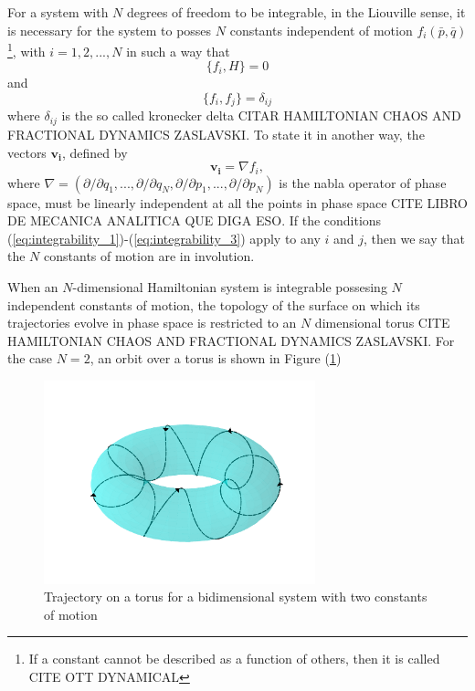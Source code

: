 For a system with $N$ degrees of freedom to be integrable, in the Liouville sense, it is necessary for the system to posses $N$ constants independent of motion $f_i(\bar{p},\bar{q})$\footnote{If a constant cannot be described as a function of others, then it is called  CITE OTT DYNAMICAL}, with $i=1,2,...,N$ in such a way that
\begin{equation}
\{f_i,H\}=0
\label{eq:integrability_1}
\end{equation}
and 
\begin{equation}
\{f_i,f_j\}=\delta_{ij}
\label{eq:integrability_2}
\end{equation}
where $\delta_{ij}$ is the so called kronecker delta CITAR HAMILTONIAN CHAOS AND FRACTIONAL DYNAMICS ZASLAVSKI. To state it in another way, the vectors $\bm{v_i}$, defined by
\begin{equation}
\bm{v_i}=\nabla f_i,
\label{eq:integrability_3}
\end{equation}
where $\nabla=(\partial/\partial q_1,...,\partial/\partial q_N,\partial/\partial p_1,...,\partial/\partial p_N)$ is the nabla operator of phase space, must be linearly independent at all the points in phase space CITE LIBRO DE MECANICA ANALITICA QUE DIGA ESO. If the conditions (\ref{eq:integrability_1})-(\ref{eq:integrability_3}) apply to any $i$ and $j$, then we say that the $N$ constants of motion are in involution.\par 

When an $N$-dimensional Hamiltonian system is integrable possesing $N$ independent constants of motion, the topology of the surface on which its trajectories evolve in phase space is restricted to an $N$ dimensional torus CITE HAMILTONIAN CHAOS AND FRACTIONAL DYNAMICS ZASLAVSKI. For the case $N=2$, an orbit over a torus is shown in Figure (\ref{fig:trajectory_torus})

\begin{figure}[H]
\centering
\includegraphics[width=0.7\textwidth]{Figures/trajectory_torus.png}
\caption{Trajectory on a torus for a bidimensional system with two constants of motion}
\label{fig:trajectory_torus}
\end{figure}

